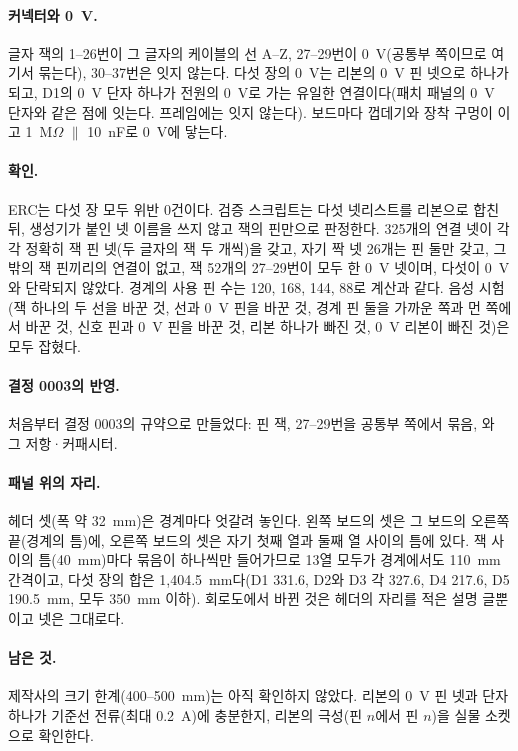 \paragraph{커넥터와 0~V.} 글자 잭의 1--26번이 그 글자의 케이블의 선 A--Z, 27--29번이 0~V(공통부 쪽이므로 여기서
묶는다), 30--37번은 잇지 않는다. 다섯 장의 0~V는 리본의 0~V 핀 넷으로 하나가 되고, D1의 0~V 단자 하나가 전원의 0~V로
가는 유일한 연결이다(패치 패널의 0~V 단자와 같은 점에 잇는다. 프레임에는 잇지 않는다). 보드마다 껍데기와 장착
구멍이 이고 1~M$\Omega$ $\parallel$ 10~nF로 0~V에 닿는다.

\paragraph{확인.} ERC는 다섯 장 모두 위반 0건이다. 검증 스크립트는 다섯 넷리스트를 리본으로 합친 뒤, 생성기가 붙인
넷 이름을 쓰지 않고 잭의 핀만으로 판정한다. 325개의 연결 넷이 각각 정확히 잭 핀 넷(두 글자의 잭 두 개씩)을 갖고,
자기 짝 넷 26개는 핀 둘만 갖고, 그 밖의 잭 핀끼리의 연결이 없고, 잭 52개의 27--29번이 모두 한 0~V 넷이며,
 다섯이 0~V와 단락되지 않았다. 경계의 사용 핀 수는 120, 168, 144, 88로 계산과 같다. 음성 시험(잭 하나의
두 선을 바꾼 것, 선과 0~V 핀을 바꾼 것, 경계 핀 둘을 가까운 쪽과 먼 쪽에서 바꾼 것, 신호 핀과 0~V 핀을 바꾼 것, 리본
하나가 빠진 것, 0~V 리본이 빠진 것)은 모두 잡혔다.

\paragraph{결정 0003의 반영.} 처음부터 결정 0003의 규약으로 만들었다: 핀 잭, 27--29번을 공통부 쪽에서 묶음,
와 그 저항·커패시터.

\paragraph{패널 위의 자리.} 헤더 셋(폭 약 32~mm)은 경계마다 엇갈려 놓인다. 왼쪽 보드의 셋은 그 보드의 오른쪽 끝(경계의
틈)에, 오른쪽 보드의 셋은 자기 첫째 열과 둘째 열 사이의 틈에 있다. 잭 사이의 틈(40~mm)마다 묶음이 하나씩만 들어가므로
13열 모두가 경계에서도 110~mm 간격이고, 다섯 장의 합은 1,404.5~mm다(D1 331.6, D2와 D3 각 327.6, D4 217.6, D5 190.5~mm,
모두 350~mm 이하). 회로도에서 바뀐 것은 헤더의 자리를 적은 설명 글뿐이고 넷은 그대로다.

\paragraph{남은 것.} 제작사의 크기 한계(400--500~mm)는 아직 확인하지 않았다. 리본의 0~V 핀 넷과 단자 하나가 기준선 전류(최대 0.2~A)에 충분한지, 리본의 극성(핀 $n$에서 핀
$n$)을 실물 소켓으로 확인한다.

